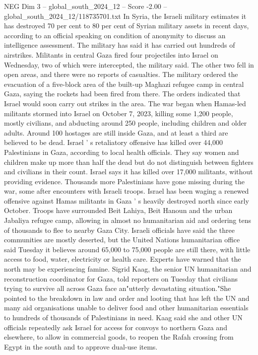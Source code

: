 \begin{textsample}{NEG Dim 3 – global\_south\_2024\_12 – Score -2.00 – global\_south\_2024\_12/118735701.txt}
In Syria, the Israeli military estimates it has destroyed 70 per cent to 80 per cent of Syrian military assets in recent days, according to an official speaking on condition of anonymity to discuss an intelligence assessment.
The military has said it has carried out hundreds of airstrikes.
Militants in central Gaza fired four projectiles into Israel on Wednesday, two of which were intercepted, the military said.
The other two fell in open areas, and there were no reports of casualties.
The military ordered the evacuation of a five-block area of the built-up Maghazi refugee camp in central Gaza, saying the rockets had been fired from there.
The orders indicated that Israel would soon carry out strikes in the area.
The war began when Hamas-led militants stormed into Israel on October 7, 2023, killing some 1,200 people, mostly civilians, and abducting around 250 people, including children and older adults.
Around 100 hostages are still inside Gaza, and at least a third are believed to be dead.
Israel ' s retaliatory offensive has killed over 44,000 Palestinians in Gaza, according to local health officials.
They say women and children make up more than half the dead but do not distinguish between fighters and civilians in their count.
Israel says it has killed over 17,000 militants, without providing evidence.
Thousands more Palestinians have gone missing during the war, some after encounters with Israeli troops.
Israel has been waging a renewed offensive against Hamas militants in Gaza ' s heavily destroyed north since early October.
Troops have surrounded Beit Lahiya, Beit Hanoun and the urban Jabaliya refugee camp, allowing in almost no humanitarian aid and ordering tens of thousands to flee to nearby Gaza City.
Israeli officials have said the three communities are mostly deserted, but the United Nations humanitarian office said Tuesday it believes around 65,000 to 75,000 people are still there, with little access to food, water, electricity or health care.
Experts have warned that the north may be experiencing famine.
Sigrid Kaag, the senior UN humanitarian and reconstruction coordinator for Gaza, told reporters on Tuesday that civilians trying to survive all across Gaza face an"utterly devastating situation."She pointed to the breakdown in law and order and looting that has left the UN and many aid organisations unable to deliver food and other humanitarian essentials to hundreds of thousands of Palestinians in need.
Kaag said she and other UN officials repeatedly ask Israel for access for convoys to northern Gaza and elsewhere, to allow in commercial goods, to reopen the Rafah crossing from Egypt in the south and to approve dual-use items.

\end{textsample}
